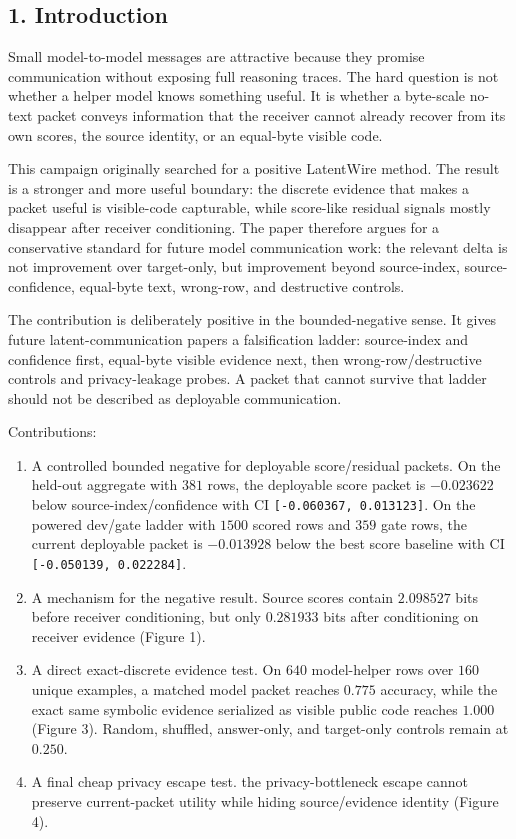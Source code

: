 \documentclass{article}
\begin{document}
\hypertarget{introduction}{%
\subsection{1. Introduction}\label{introduction}}

Small model-to-model messages are attractive because they promise
communication without exposing full reasoning traces. The hard question
is not whether a helper model knows something useful. It is whether a
byte-scale no-text packet conveys information that the receiver cannot
already recover from its own scores, the source identity, or an
equal-byte visible code.

This campaign originally searched for a positive LatentWire method. The
result is a stronger and more useful boundary: the discrete evidence
that makes a packet useful is visible-code capturable, while score-like
residual signals mostly disappear after receiver conditioning. The paper
therefore argues for a conservative standard for future model
communication work: the relevant delta is not improvement over
target-only, but improvement beyond source-index, source-confidence,
equal-byte text, wrong-row, and destructive controls.

The contribution is deliberately positive in the bounded-negative sense.
It gives future latent-communication papers a falsification ladder:
source-index and confidence first, equal-byte visible evidence next,
then wrong-row/destructive controls and privacy-leakage probes. A packet
that cannot survive that ladder should not be described as deployable
communication.

Contributions:

\begin{enumerate}
\def\labelenumi{\arabic{enumi}.}
\item
  A controlled bounded negative for deployable score/residual packets.
  On the held-out aggregate with \(381\) rows, the deployable score
  packet is \(-0.023622\) below source-index/confidence with CI
  \texttt{{[}-0.060367,\ 0.013123{]}}. On the powered dev/gate ladder
  with \(1500\) scored rows and \(359\) gate rows, the current
  deployable packet is \(-0.013928\) below the best score baseline
  with CI \texttt{{[}-0.050139,\ 0.022284{]}}.
\item
  A mechanism for the negative result. Source scores contain
  \(2.098527\) bits before receiver conditioning, but only
  \(0.281933\) bits after conditioning on receiver evidence (Figure
  1).
\item
  A direct exact-discrete evidence test. On \(640\) model-helper
  rows over \(160\) unique examples, a matched model packet reaches
  \(0.775\) accuracy, while the exact same symbolic evidence
  serialized as visible public code reaches \(1.000\) (Figure 3).
  Random, shuffled, answer-only, and target-only controls remain at
  \(0.250\).
\item
  A final cheap privacy escape test. the privacy-bottleneck escape
  cannot preserve current-packet utility while hiding source/evidence
  identity (Figure 4).
\end{enumerate}
\end{document}
